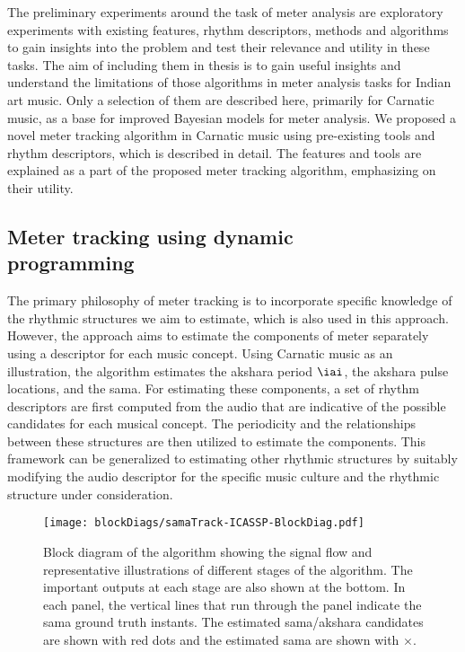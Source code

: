 The preliminary experiments around the task of meter analysis are exploratory experiments with existing features, rhythm descriptors, methods and algorithms to gain insights into the problem and test their relevance and utility in these tasks. The aim of including them in thesis is to gain useful insights and understand the limitations of those algorithms in meter analysis tasks for Indian art music. Only a selection of them are described here, primarily for Carnatic music, as a base for improved Bayesian models for meter analysis. We proposed a novel meter tracking algorithm in Carnatic music \cite{ajay:14:talaTrack} using pre-existing tools and rhythm descriptors, which is described in detail. The features and tools are explained as a part of the proposed meter tracking algorithm, emphasizing on their utility. 
%
\subsection[Meter tracking using dynamic programming]{Meter tracking using dynamic\\ programming}\label{sec:metertrack:dp}
The primary philosophy of meter tracking is to incorporate specific knowledge of the rhythmic structures we aim to estimate, which is also used in this approach. However, the approach aims to estimate the components of meter separately using a descriptor for each music concept. Using Carnatic music as an illustration, the algorithm estimates the \gls{akshara} period $\iai$, the \gls{akshara} pulse locations, and the \gls{sama}. For estimating these components, a set of rhythm descriptors are first computed from the audio that are indicative of the possible candidates for each musical concept. The periodicity and the relationships between these structures are then utilized to estimate the components. This framework can be generalized to estimating other rhythmic structures by suitably modifying the audio descriptor for the specific music culture and the rhythmic structure under consideration. 
\begin{figure}
  \centering
 \texttt{[image: blockDiags/samaTrack-ICASSP-BlockDiag.pdf]}
\caption[Block diagram of the \gls{tala} tracking algorithm proposed by \protect{}]{Block diagram of the algorithm showing the signal flow and representative illustrations of different stages of the algorithm. The important outputs at each stage are also shown at the bottom. In each panel, the vertical lines that run through the panel indicate the \gls{sama} ground truth instants. The estimated \gls{sama}/\gls{akshara} candidates are shown with red dots and the estimated \gls{sama} are shown with $\times$.}\label{fig:BD:samaTrackICASSP}
\end{figure}

